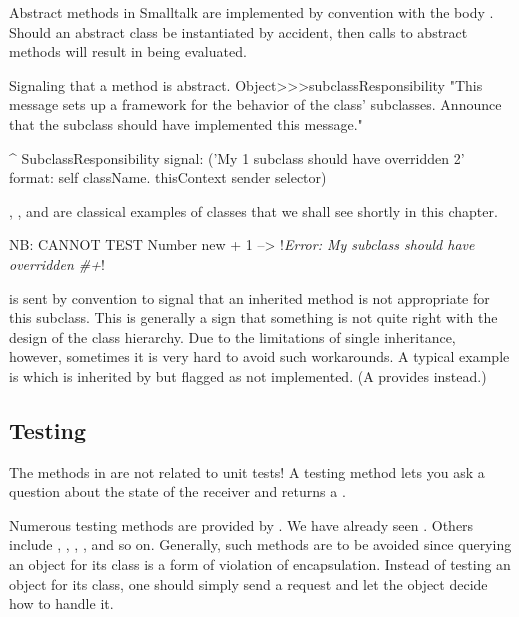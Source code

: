 \documentclass[a4paper,10pt,twoside]{book}
\begin{document}
Abstract methods in Smalltalk are implemented by convention with the body .
Should an abstract class be instantiated by accident, then calls to abstract methods will result in  being evaluated.

\begin{method}{Signaling that a method is abstract.}
Object>>>subclassResponsibility
    "This message sets up a framework for the behavior of the class' subclasses.
    Announce that the subclass should have implemented this message."

    ^ SubclassResponsibility
        signal: ('My {1} subclass should have overridden {2}'
            format: {self className. thisContext sender selector})
\end{method}

, , and  are classical examples of  classes that we shall see shortly in this chapter.

\begin{code}{NB: CANNOT TEST}
Number new + 1 --> !\emph{Error: My subclass should have overridden \#+}!
\end{code}

 is sent by convention to signal that an inherited method is not appropriate for this subclass.
This is generally a sign that something is not quite right with the design of the class hierarchy.
Due to the limitations of single inheritance, however, sometimes it is very hard to avoid such workarounds.
A typical example is  which is inherited by  but flagged as not implemented.
(A  provides  instead.)


\subsection{Testing}

The methods in  are not related to unit tests!
A testing method lets you ask a question about the state of the receiver and returns a .

Numerous testing methods are provided by .
We have already seen .
Others include , , , , and so on.
Generally, such methods are to be avoided since querying an object for its class is a form of violation of encapsulation.
Instead of testing an object for its class, one should simply send a request and let the object decide how to handle it.
\end{document}
